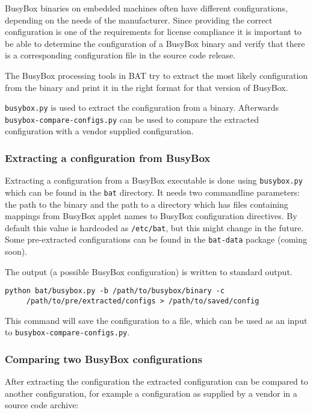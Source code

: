 \documentclass[10pt,a4paper]{article}
\begin{document}
BusyBox binaries on embedded machines often have different configurations,
depending on the needs of the manufacturer. Since providing the correct
configuration is one of the requirements for license compliance it is important
to be able to determine the configuration of a BusyBox binary and verify that
there is a corresponding configuration file in the source code release.

The BusyBox processing tools in BAT try to extract the most likely
configuration from the binary and print it in the right format for that version
of BusyBox.

\texttt{busybox.py} is used to extract the configuration from a binary.
Afterwards \texttt{busybox-compare-configs.py} can be used to compare the
extracted configuration with a vendor supplied configuration.

\subsubsection{Extracting a configuration from BusyBox}

Extracting a configuration from a BusyBox executable is done using
\texttt{busybox.py} which can be found in the \texttt{bat} directory. It needs
two commandline parameters: the path to the binary and the path to a directory
which has files containing mappings from BusyBox applet names to BusyBox
configuration directives. By default this value is hardcoded as
\texttt{/etc/bat}, but this might change in the future. Some pre-extracted
configurations can be found in the \texttt{bat-data} package (coming soon).

The output (a possible BusyBox configuration) is written to standard output.

\begin{verbatim}
python bat/busybox.py -b /path/to/busybox/binary -c
     /path/to/pre/extracted/configs > /path/to/saved/config
\end{verbatim}

This command will save the configuration to a file, which can be used as an
input to \texttt{busybox-compare-configs.py}.

\subsubsection{Comparing two BusyBox configurations}

After extracting the configuration the extracted configuration can be compared
to another configuration, for example a configuration as supplied by a vendor
in a source code archive:
\end{document}
